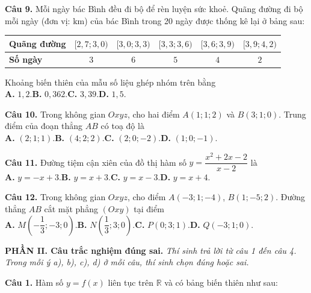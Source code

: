 \documentclass[12pt,a4paper]{article}
\begin{document}
\newpage
\textbf{Câu 9.} Mỗi ngày bác Bình đều đi bộ để rèn luyện sức khoẻ. Quãng đường đi bộ mỗi ngày (đơn vị: $\text{km}$) của bác Bình trong 20 ngày được thống kê lại ở bảng sau:

\begin{center}
\begin{tabular}{|l|c|c|c|c|c|}
\hline
\textbf{Quãng đường} & $[2{,}7; 3{,}0)$ & $[3{,}0; 3{,}3)$ & $[3{,}3; 3{,}6)$ & $[3{,}6; 3{,}9)$ & $[3{,}9; 4{,}2)$ \\
\hline
\textbf{Số ngày} & $3$ & $6$ & $5$ & $4$ & $2$ \\
\hline
\end{tabular}
\end{center}

Khoảng biến thiên của mẫu số liệu ghép nhóm trên bằng\\
\textbf{A.} $1{,}2$.\TAB\textbf{B.} $0{,}362$.\TAB\textbf{C.} $3{,}39$.\TAB\textbf{D.} $1{,}5$.

\vspace{0.15cm}
\textbf{Câu 10.} Trong không gian $Oxyz$, cho hai điểm $A(1; 1; 2)$ và $B(3; 1; 0)$. Trung điểm của đoạn thẳng $AB$ có toạ độ là\\
\textbf{A.} $(2; 1; 1)$.\TAB\textbf{B.} $(4; 2; 2)$.\TAB\textbf{C.} $(2; 0; -2)$.\TAB\textbf{D.} $(1; 0; -1)$.

\vspace{0.15cm}
\textbf{Câu 11.} Đường tiệm cận xiên của đồ thị hàm số $y = \dfrac{x^2 + 2x - 2}{x - 2}$ là\\
\textbf{A.} $y = -x + 3$.\TAB\textbf{B.} $y = x + 3$.\TAB\textbf{C.} $y = x - 3$.\TAB\textbf{D.} $y = x + 4$.

\vspace{0.15cm}
\textbf{Câu 12.} Trong không gian $Oxyz$, cho điểm $A(-3; 1; -4)$, $B(1; -5; 2)$. Đường thẳng $AB$ cắt mặt phẳng $(Oxy)$ tại điểm\\
\textbf{A.} $M\left(-\dfrac{1}{3}; -3; 0\right)$.\TAB\textbf{B.} $N\left(\dfrac{1}{3}; 3; 0\right)$.\TAB\textbf{C.} $P(0; 3; 1)$.\TAB\textbf{D.} $Q(-3; 1; 0)$.

\vspace{0.3cm}
\noindent\textbf{\large PHẦN II. Câu trắc nghiệm đúng sai.} \textit{Thí sinh trả lời từ câu 1 đến câu 4. Trong mỗi ý a), b), c), d) ở mỗi câu, thí sinh chọn đúng hoặc sai.}

\vspace{0.15cm}
\textbf{Câu 1.} Hàm số $y = f(x)$ liên tục trên $\mathbb{R}$ và có bảng biến thiên như sau:
\end{document}

